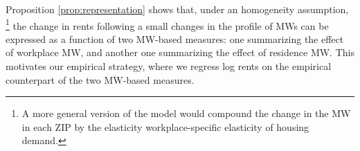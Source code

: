 Proposition \ref{prop:representation} shows that, under an homogeneity assumption,%
\footnote{A more general version of the model would compound the change in the MW
in each ZIP by the elasticity workplace-specific elasticity of housing demand.}
the change in rents following a small changes in the profile of MWs can be expressed 
as a function of two MW-based measures: one summarizing the effect of workplace MW,
and another one summarizing the effect of residence MW.
This motivates our empirical strategy, where we regress log rents on the empirical
counterpart of the two MW-based measures.
